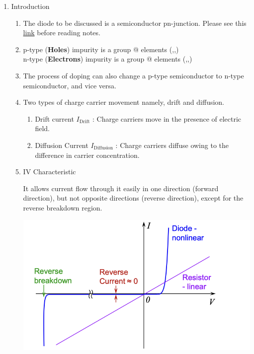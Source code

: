 \documentclass{article}
\makeatletter
\newcommand*{\rom}[1]{\expandafter\@slowromancap\romannumeral #1@}
\makeatother
\begin{document}
\begin{enumerate}
    \item Introduction
    \begin{enumerate}
        \item The diode to be discussed is a semiconductor pn-junction. Please see this \href{https://www.youtube.com/watch?v=Fwj_d3uO5g8}{link} before reading notes.
        \item p-type (\textbf{Holes}) impurity is a group \rom{3} elements (,,)\\
        n-type (\textbf{Electrons}) impurity is a group \rom{5} elements (,,)
        \item The process of doping can also change a p-type semiconductor to n-type semiconductor, and vice versa.
        \item Two types of charge carrier movement namely, drift and diffusion.
        \begin{enumerate}
            \item Drift current $I_{\text{Drift}}$ : Charge carriers move in the presence of electric field.
            \item Diffusion Current $I_{\text{Diffusion}}$ : Charge carriers diffuse owing to the difference in carrier concentration.
        \end{enumerate}
        \item IV Characteristic\\
            \begin{minipage}{0.4\textwidth}
            It allows current flow through it easily in one direction (forward direction), but not opposite directions (reverse direction), except for the reverse breakdown region.
            \end{minipage}
            \begin{minipage}{0.6\textwidth}
                \includegraphics[width=1\linewidth]{image/pnchar.png}

\end{minipage}
\end{enumerate}
\end{enumerate}
\end{document}
